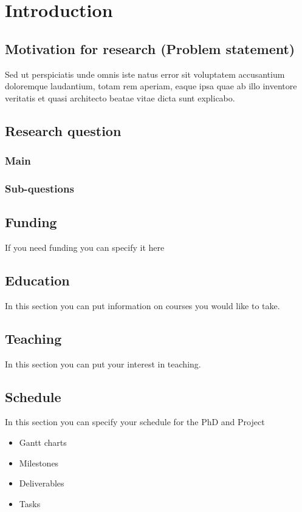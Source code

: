 \chapter{Introduction}
\label{chap:1.1}
\section{Motivation for research (Problem statement)}
Sed ut perspiciatis unde omnis iste natus error sit voluptatem accusantium doloremque laudantium, totam rem aperiam, eaque ipsa quae ab illo inventore veritatis et quasi architecto beatae vitae dicta sunt explicabo. 

\section{Research question}
\subsection{Main}
\subsection{Sub-questions}

\section{Funding}
If you need funding you can specify it here
\section{Education}
In this section you can put information on courses you would like to take. 
\section{Teaching}
In this section you can put your interest in teaching.
\section{Schedule}
In this section you can specify your schedule for the PhD and Project
\begin{itemize}
	\item Gantt charts
	\item Milestones
	\item Deliverables
	\item Tasks
\end{itemize}
